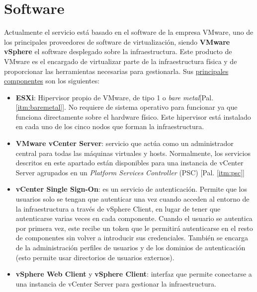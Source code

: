 \section{Software}
\label{subsec:softwareinstalado}
Actualmente el servicio está basado en el software de la empresa VMware, uno de los principales proveedores de software de virtualización, siendo \textbf{VMware vSphere} el software desplegado sobre la infraestructura. Este producto de VMware es el encargado de virtualizar parte de la infraestructura física y de proporcionar las herramientas necesarias para gestionarla. Sus \underline{principales componentes} son los siguientes:
\begin{itemize}
    
    \item \textbf{ESXi}: Hipervisor propio de VMware, de tipo 1 o \textit{bare metal}[Pal. \ref{itm:baremetal}]. No requiere de sistema operativo para funcionar ya que funciona directamente sobre el hardware físico\cite{Esxi}. Este hipervisor está instalado en cada uno de los cinco nodos que forman la infraestructura.
    
    \item \textbf{VMware vCenter Server}: servicio que actúa como un administrador central para todas las máquinas virtuales y hosts. Normalmente, los servicios descritos en este apartado están disponibles para una instancia de vCenter Server agrupados en un \textit{Platform Services Controller} (PSC) [Pal. \ref{itm:psc}]
    
    \item \textbf{vCenter Single Sign-On}: es un servicio de autenticación. Permite que los usuarios solo se tengan que autenticar una vez cuando acceden al entorno de la infraestructura a través de vSphere Client, en lugar de tener que autenticarse varias veces en cada componente. Cuando el usuario se autentica por primera vez, este recibe un token que le permitirá autenticarse en el resto de componentes sin volver a introducir sus credenciales. También se encarga de la administración perfiles de usuarios y de los dominios de autenticación (esto permite usar directorios de usuarios externos).\label{itm:singlesingonEX}
    

    \item \textbf{vSphere Web Client} y \textbf{vSphere Client}: interfaz que permite conectarse a una instancia de vCenter Server para gestionar la infraestructura.
    

\end{itemize}
